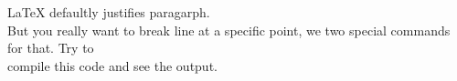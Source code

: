 \documentclass[a4paper, 12pt]{article}
\begin{document}
	\LaTeX{} defaultly justifies paragarph. \\ But you really want to break
	line at a specific \newline\newline point, we two special commands for that.
	Try to \\[1cm] compile this code and see the output.
\end{document}

